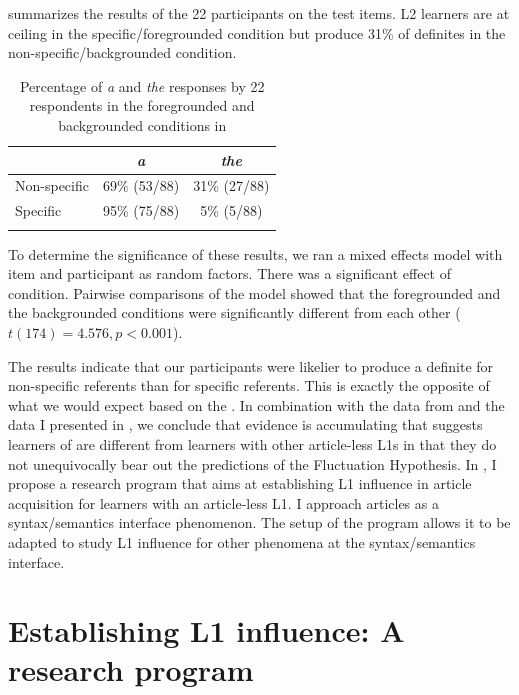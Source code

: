 \documentclass[output=paper,
modfonts
]{langscibook}
\begin{document}
 summarizes the results of the 22 participants on the test items. L2 learners are at ceiling in the specific/foregrounded condition but produce 31\% of definites in the non-specific/backgrounded condition.

\begin{table}[h]
\begin{tabular}{lcc}
\lsptoprule
 & \textit{a} & \textit{the} \\
\midrule
Non-specific & 69\% (53/88) & 31\% (27/88)  \\
Specific & 95\% (75/88) & 5\% (5/88) \\
\lspbottomrule
\end{tabular}
\caption{Percentage of \textit{a} and \textit{the} responses by 22  respondents in the foregrounded and backgrounded conditions in \citet{LeBruynDong2017T}}
\label{tab:lebruyn:7}
\end{table}

To determine the significance of these results, we ran a mixed effects model with item and participant as random factors. There was a significant effect of condition. Pairwise comparisons of the model showed that the foregrounded and the backgrounded conditions were significantly different from each other ($t(174)=4.576, p<0.001$).

The results indicate that our participants were likelier to produce a definite for non-specific referents than for specific referents. This is exactly the opposite of what we would expect based on the . In combination with the data from \citet{Ting2005} and the data I presented in , we conclude that evidence is accumulating that suggests  learners of  are different from learners with other article-less L1s in that they do not unequivocally bear out the predictions of the Fluctuation Hypothesis. In , I propose a research program that aims at establishing L1 influence in article acquisition for learners with an article-less L1. I approach articles as a syntax/semantics interface phenomenon. The setup of the program allows it to be adapted to study L1 influence for other phenomena at the syntax/semantics interface. 

\section{Establishing L1 influence: A research program}\largerpage
\label{sec:lebruyn:5}
\end{document}
